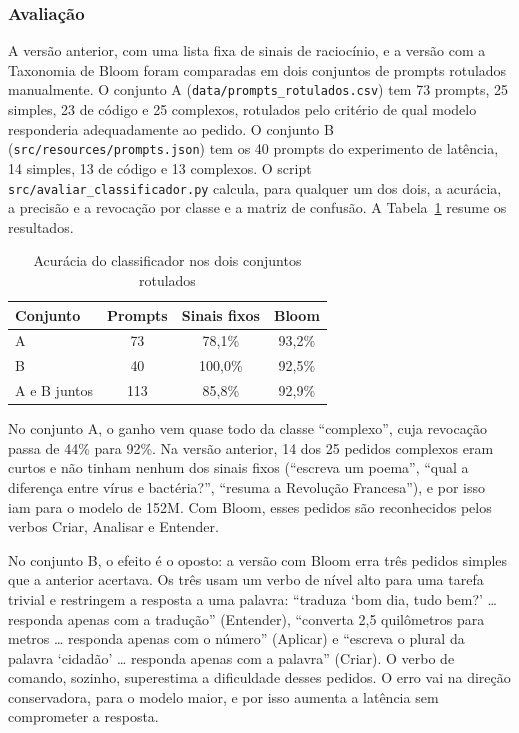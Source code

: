 \subsubsection{Avaliação}

A versão anterior, com uma lista fixa de sinais de raciocínio, e a versão com a Taxonomia de Bloom foram comparadas em dois conjuntos de prompts rotulados manualmente. O conjunto A (\texttt{data/prompts\_rotulados.csv}) tem 73 prompts, 25 simples, 23 de código e 25 complexos, rotulados pelo critério de qual modelo responderia adequadamente ao pedido. O conjunto B (\texttt{src/resources/prompts.json}) tem os 40 prompts do experimento de latência, 14 simples, 13 de código e 13 complexos. O script \texttt{src/avaliar\_classificador.py} calcula, para qualquer um dos dois, a acurácia, a precisão e a revocação por classe e a matriz de confusão. A Tabela~\ref{tab:avaliacao-classificador} resume os resultados.

\begin{table}[ht]
\centering
\caption{Acurácia do classificador nos dois conjuntos rotulados}
\label{tab:avaliacao-classificador}
\begin{tabular}{lccc}
\hline
\textbf{Conjunto} & \textbf{Prompts} & \textbf{Sinais fixos} & \textbf{Bloom} \\ \hline
A & 73 & 78,1\% & 93,2\% \\
B & 40 & 100,0\% & 92,5\% \\
A e B juntos & 113 & 85,8\% & 92,9\% \\ \hline
\end{tabular}
\end{table}

No conjunto A, o ganho vem quase todo da classe ``complexo'', cuja revocação passa de 44\% para 92\%. Na versão anterior, 14 dos 25 pedidos complexos eram curtos e não tinham nenhum dos sinais fixos (``escreva um poema'', ``qual a diferença entre vírus e bactéria?'', ``resuma a Revolução Francesa''), e por isso iam para o modelo de 152M. Com Bloom, esses pedidos são reconhecidos pelos verbos Criar, Analisar e Entender.

No conjunto B, o efeito é o oposto: a versão com Bloom erra três pedidos simples que a anterior acertava. Os três usam um verbo de nível alto para uma tarefa trivial e restringem a resposta a uma palavra: ``traduza `bom dia, tudo bem?' \ldots{} responda apenas com a tradução'' (Entender), ``converta 2,5 quilômetros para metros \ldots{} responda apenas com o número'' (Aplicar) e ``escreva o plural da palavra `cidadão' \ldots{} responda apenas com a palavra'' (Criar). O verbo de comando, sozinho, superestima a dificuldade desses pedidos. O erro vai na direção conservadora, para o modelo maior, e por isso aumenta a latência sem comprometer a resposta.

